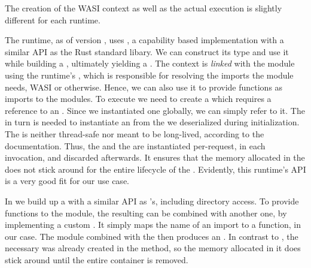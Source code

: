 The creation of the WASI context as well as the actual execution is slightly different for each runtime.


\begin{description}[style=multiline, leftmargin=2.5cm, font=\bfseries]

    \item[Wasmtime] The  runtime, as of version , uses , a capability based implementation with a similar API as the Rust standard libary. We can construct its  type and use it while building a , ultimately yielding a . The context is \emph{linked} with the module using the runtime's , which is responsible for resolving the imports the module needs, WASI or otherwise. Hence, we can also use it to provide functions as imports to the modules.
    To execute we need to create a  which requires a reference to an . Since we instantiated one globally, we can simply refer to it. The  in turn is needed to instantiate an  from the  we deserialized during initialization. The  is neither thread-safe nor meant to be long-lived, according to the documentation. Thus, the  and the  are instantiated per-request, in each  invocation, and discarded afterwards. It ensures that the memory allocated in the  does not stick around for the entire lifecycle of the . Evidently, this runtime's API is a very good fit for our use case.

    \item[Wasmer] In  we build up a  with a similar API as 's, including directory access. To provide functions to the module, the resulting  can be combined with another one, by implementing a custom . It simply maps the name of an import to a function, in our case. The module combined with the  then produces an . In contrast to , the necessary  was already created in the  method, so the memory allocated in it does stick around until the entire container is removed.


\end{description}
